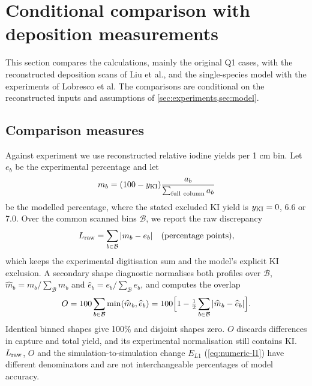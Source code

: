 \section{Conditional comparison with deposition measurements}
\label{sec:comparison}
This section compares the calculations, mainly the original Q1 cases,
with the reconstructed deposition scans of Liu et al., and the
single-species model with the experiments of Lobresco et al. The
comparisons are conditional on the reconstructed inputs and assumptions
of \cref{sec:experiments,sec:model}.

\subsection{Comparison measures}
Against experiment we use reconstructed relative iodine
yields per 1 cm bin. Let $e_b$ be the experimental percentage and let
\begin{equation}
 m_b=(100-y_{\rm KI})\frac{a_b}{\sum_{\rm full\ column}a_b}
 \label{eq:yield}
\end{equation}
be the modelled percentage, where the stated excluded KI yield is
$y_{\rm KI}=0$, 6.6 or 7.0. Over the common scanned bins $\mathcal B$,
we report the raw discrepancy
\begin{equation}
 L_{\rm raw}=\sum_{b\in\mathcal B}|m_b-e_b|
 \quad\text{(percentage points)},
 \label{eq:raw-l1}
\end{equation}
which keeps the experimental digitisation sum and the model's explicit
KI exclusion. A secondary shape diagnostic normalises both profiles over
$\mathcal B$, $\widehat m_b=m_b/\sum_{\mathcal B}m_b$ and
$\widehat e_b=e_b/\sum_{\mathcal B}e_b$, and computes the overlap
\begin{equation}
 O=100\sum_{b\in\mathcal B}\min(\widehat m_b,\widehat e_b)
 =100\Bigl[1-\tfrac12\sum_{b\in\mathcal B}|\widehat m_b-\widehat e_b|\Bigr].
 \label{eq:overlap}
\end{equation}
Identical binned shapes give 100\% and disjoint shapes zero. $O$
discards differences in capture and total yield, and its experimental
normalisation still contains KI. $L_{\rm raw}$, $O$ and the
simulation-to-simulation change $E_{L1}$ (\cref{eq:numeric-l1}) have
different denominators and are not interchangeable percentages of model
accuracy.

